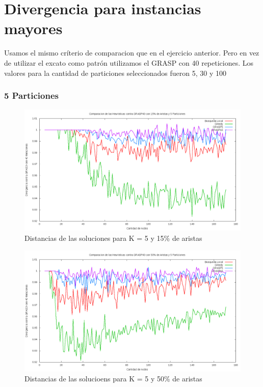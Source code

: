 \section{Divergencia para instancias mayores}

Usamos el mismo cr\'iterio de comparacion que en el ejercicio anterior. Pero en vez de utilizar el excato como patr\'on utilizamos el GRASP con 40 repeticiones. Los valores para la cantidad de particiones seleccionados fueron 5, 30 y 100

\subsubsection{5 Particiones}

\begin{figure}[H]
\begin{center}
\includegraphics[scale=0.4]{finales/muchosComparacionesCon5Particiones15Aristas.png}
\caption{Distancias de las soluciones para K = 5 y 15\% de aristas}
\end{center}
\end{figure}

\begin{figure}[H]
\begin{center}
\includegraphics[scale=0.4]{finales/muchosComparacionesCon5Particiones50Aristas.png}
\caption{Distancias de las solucioens para K = 5 y 50\% de aristas}
\end{center}
\end{figure}

